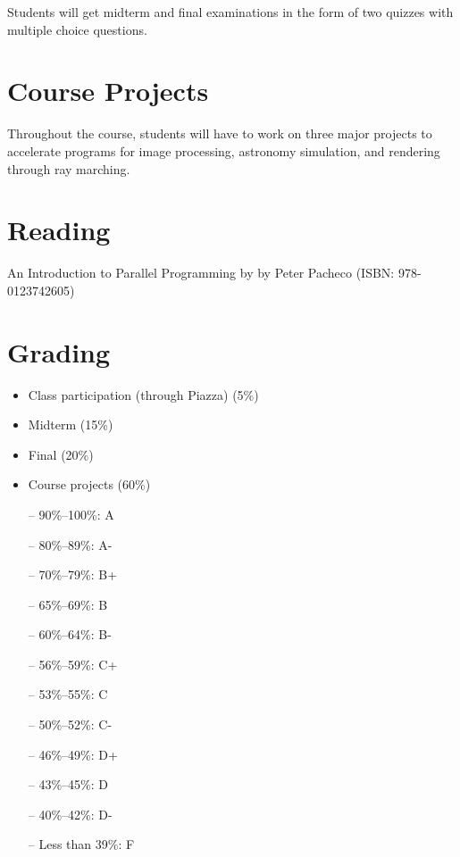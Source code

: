 \documentclass[12pt,a4paper,oneside]{article}
\begin{document}
        Students will get midterm and final examinations in the form of two
        quizzes with multiple choice questions.

    \section{Course Projects}

        Throughout the course, students will have to work on three major
        projects to accelerate programs for image processing, astronomy
        simulation, and rendering through ray marching.

    \section{Reading}

        An Introduction to Parallel Programming by by Peter Pacheco (ISBN:
        978-0123742605)

    \section{Grading}

        \begin{itemize}
            \item Class participation (through Piazza) (5\%)
            \item Midterm (15\%)
            \item Final (20\%)
            \item Course projects (60\%)
        \end{itemize}

        \begin{itemize} \itemsep-10pt \parskip0pt 
            \item[--] 90\%--100\%: A\\
            \item[--] 80\%--89\%: A-\\
            \item[--] 70\%--79\%: B+\\
            \item[--] 65\%--69\%: B\\
            \item[--] 60\%--64\%: B-\\
            \item[--] 56\%--59\%: C+\\
            \item[--] 53\%--55\%: C\\
            \item[--] 50\%--52\%: C-\\
            \item[--] 46\%--49\%: D+\\
            \item[--] 43\%--45\%: D\\
            \item[--] 40\%--42\%: D-\\
            \item[--] Less than 39\%: F
        \end{itemize}
\end{document}
